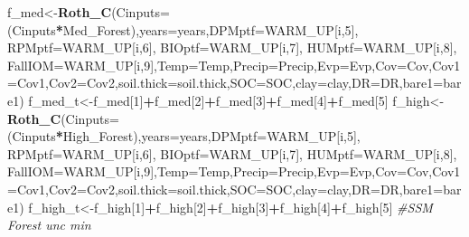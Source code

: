 \documentclass[
  10pt,
  b5paper,
]{book}
\newenvironment{Shaded}{\begin{snugshade}}{\end{snugshade}}
\newcommand{\CommentTok}[1]{\textcolor[rgb]{0.56,0.35,0.01}{\textit{#1}}}
\newcommand{\DataTypeTok}[1]{\textcolor[rgb]{0.13,0.29,0.53}{#1}}
\newcommand{\DecValTok}[1]{\textcolor[rgb]{0.00,0.00,0.81}{#1}}
\newcommand{\KeywordTok}[1]{\textcolor[rgb]{0.13,0.29,0.53}{\textbf{#1}}}
\newcommand{\NormalTok}[1]{#1}
\newcommand{\OperatorTok}[1]{\textcolor[rgb]{0.81,0.36,0.00}{\textbf{#1}}}
\begin{document}
\begin{Shaded}
\begin{Highlighting}[]
\NormalTok{f_med<-}\KeywordTok{Roth_C}\NormalTok{(}\DataTypeTok{Cinputs=}\NormalTok{(Cinputs}\OperatorTok{*}\NormalTok{Med_Forest),}\DataTypeTok{years=}\NormalTok{years,}\DataTypeTok{DPMptf=}\NormalTok{WARM_UP[i,}\DecValTok{5}\NormalTok{], }\DataTypeTok{RPMptf=}\NormalTok{WARM_UP[i,}\DecValTok{6}\NormalTok{], }\DataTypeTok{BIOptf=}\NormalTok{WARM_UP[i,}\DecValTok{7}\NormalTok{], }\DataTypeTok{HUMptf=}\NormalTok{WARM_UP[i,}\DecValTok{8}\NormalTok{], }\DataTypeTok{FallIOM=}\NormalTok{WARM_UP[i,}\DecValTok{9}\NormalTok{],}\DataTypeTok{Temp=}\NormalTok{Temp,}\DataTypeTok{Precip=}\NormalTok{Precip,}\DataTypeTok{Evp=}\NormalTok{Evp,}\DataTypeTok{Cov=}\NormalTok{Cov,}\DataTypeTok{Cov1=}\NormalTok{Cov1,}\DataTypeTok{Cov2=}\NormalTok{Cov2,}\DataTypeTok{soil.thick=}\NormalTok{soil.thick,}\DataTypeTok{SOC=}\NormalTok{SOC,}\DataTypeTok{clay=}\NormalTok{clay,}\DataTypeTok{DR=}\NormalTok{DR,}\DataTypeTok{bare1=}\NormalTok{bare1)}
\NormalTok{f_med_t<-f_med[}\DecValTok{1}\NormalTok{]}\OperatorTok{+}\NormalTok{f_med[}\DecValTok{2}\NormalTok{]}\OperatorTok{+}\NormalTok{f_med[}\DecValTok{3}\NormalTok{]}\OperatorTok{+}\NormalTok{f_med[}\DecValTok{4}\NormalTok{]}\OperatorTok{+}\NormalTok{f_med[}\DecValTok{5}\NormalTok{]}
\NormalTok{f_high<-}\KeywordTok{Roth_C}\NormalTok{(}\DataTypeTok{Cinputs=}\NormalTok{(Cinputs}\OperatorTok{*}\NormalTok{High_Forest),}\DataTypeTok{years=}\NormalTok{years,}\DataTypeTok{DPMptf=}\NormalTok{WARM_UP[i,}\DecValTok{5}\NormalTok{], }\DataTypeTok{RPMptf=}\NormalTok{WARM_UP[i,}\DecValTok{6}\NormalTok{], }\DataTypeTok{BIOptf=}\NormalTok{WARM_UP[i,}\DecValTok{7}\NormalTok{], }\DataTypeTok{HUMptf=}\NormalTok{WARM_UP[i,}\DecValTok{8}\NormalTok{], }\DataTypeTok{FallIOM=}\NormalTok{WARM_UP[i,}\DecValTok{9}\NormalTok{],}\DataTypeTok{Temp=}\NormalTok{Temp,}\DataTypeTok{Precip=}\NormalTok{Precip,}\DataTypeTok{Evp=}\NormalTok{Evp,}\DataTypeTok{Cov=}\NormalTok{Cov,}\DataTypeTok{Cov1=}\NormalTok{Cov1,}\DataTypeTok{Cov2=}\NormalTok{Cov2,}\DataTypeTok{soil.thick=}\NormalTok{soil.thick,}\DataTypeTok{SOC=}\NormalTok{SOC,}\DataTypeTok{clay=}\NormalTok{clay,}\DataTypeTok{DR=}\NormalTok{DR,}\DataTypeTok{bare1=}\NormalTok{bare1)}
\NormalTok{f_high_t<-f_high[}\DecValTok{1}\NormalTok{]}\OperatorTok{+}\NormalTok{f_high[}\DecValTok{2}\NormalTok{]}\OperatorTok{+}\NormalTok{f_high[}\DecValTok{3}\NormalTok{]}\OperatorTok{+}\NormalTok{f_high[}\DecValTok{4}\NormalTok{]}\OperatorTok{+}\NormalTok{f_high[}\DecValTok{5}\NormalTok{]}
\CommentTok{#SSM Forest unc min}

\end{Highlighting}
\end{Shaded}
\end{document}
